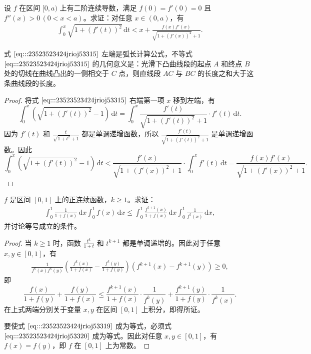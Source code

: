 \documentclass[../../main.tex]{subfiles}
\begin{document}
\begin{proposition}
设 \( f \) 在区间 \([0,a)\) 上有二阶连续导数，满足 \( f(0) = f'(0) = 0 \) 且 \( f''(x) > 0 \, (0 < x < a) \)。求证：对任意 \( x \in (0,a) \)，有
\begin{align}
\int_{0}^{x} \sqrt{1 + (f'(t))^2} \, \mathrm{d}t < x + \frac{f(x)f'(x)}{\sqrt{1 + (f'(x))^2} + 1}. \label{eq:::23523523424jrioj53315}
\end{align}
\end{proposition}
\begin{remark}
式 \(\eqref{eq:::23523523424jrioj53315}\) 左端是弧长计算公式，不等式 \(\eqref{eq:::23523523424jrioj53315}\) 的几何意义是：光滑下凸曲线段的起点 \( A \) 和终点 \( B \) 处的切线在曲线凸出的一侧相交于 \( C \) 点，则直线段 \( AC \) 与 \( BC \) 的长度之和大于这条曲线段的长度。
\end{remark}
\begin{proof}
将式 \(\eqref{eq:::23523523424jrioj53315}\) 右端第一项 \( x \) 移到左端，有
\[
\int_{0}^{x} \left( \sqrt{1 + (f'(t))^2} - 1 \right) \, \mathrm{d}t = \int_{0}^{x} \frac{f'(t)}{\sqrt{1 + (f'(t))^2} + 1} \cdot f'(t) \, \mathrm{d}t.
\]
因为 \( f'(t) \) 和 \( \frac{t}{\sqrt{1 + t^2} + 1} \) 都是单调递增函数，所以 \( \frac{f'(t)}{\sqrt{1 + (f'(t))^2} + 1} \) 是单调递增函数。因此
\[
\int_{0}^{x} \left( \sqrt{1 + (f'(t))^2} - 1 \right) \, \mathrm{d}t < \frac{f'(x)}{\sqrt{1 + (f'(x))^2} + 1} \cdot \int_{0}^{x} f'(t) \, \mathrm{d}t = \frac{f(x)f'(x)}{\sqrt{1 + (f'(x))^2} + 1}.
\]

\end{proof}

\begin{example}
\( f \) 是区间 \([0,1]\) 上的正连续函数，\( k \geqslant 1 \)。求证：
\begin{align}
\int_{0}^{1} \frac{1}{1 + f(x)} \, \mathrm{d}x \int_{0}^{1} f(x) \, \mathrm{d}x \leqslant \int_{0}^{1} \frac{f^{k + 1}(x)}{1 + f(x)} \, \mathrm{d}x \int_{0}^{1} \frac{1}{f^k(x)} \, \mathrm{d}x, \label{eq:::23523523424jrioj53319}
\end{align}
并讨论等号成立的条件。
\end{example}
\begin{proof}
当 \( k \geqslant 1 \) 时，函数 \( \frac{t^k}{1 + t} \) 和 \( t^{k + 1} \) 都是单调递增的。因此对于任意 \( x, y \in [0,1] \)，有
\begin{align}
\frac{1}{f^k(x)f^k(y)} \left( \frac{f^k(x)}{1 + f(x)} - \frac{f^k(y)}{1 + f(y)} \right) \left( f^{k + 1}(x) - f^{k + 1}(y) \right) \geqslant 0, \label{eq:::23523523424jrioj53320}
\end{align}
即
\[
\frac{f(x)}{1 + f(y)} + \frac{f(y)}{1 + f(x)} \leqslant \frac{f^{k + 1}(x)}{1 + f(x)} \cdot \frac{1}{f^k(y)} + \frac{f^{k + 1}(y)}{1 + f(y)} \cdot \frac{1}{f^k(x)}.
\]
在上式两端分别关于变量 \( x, y \) 在区间 \([0,1]\) 上积分，即得所证。

要使式 \(\eqref{eq:::23523523424jrioj53319}\) 成为等式，必须式 \(\eqref{eq:::23523523424jrioj53320}\) 成为等式。因此对任意 \( x, y \in [0,1] \)，有 \( f(x) = f(y) \)，即 \( f \) 在 \([0,1]\) 上为常数。

\end{proof}
\end{document}
